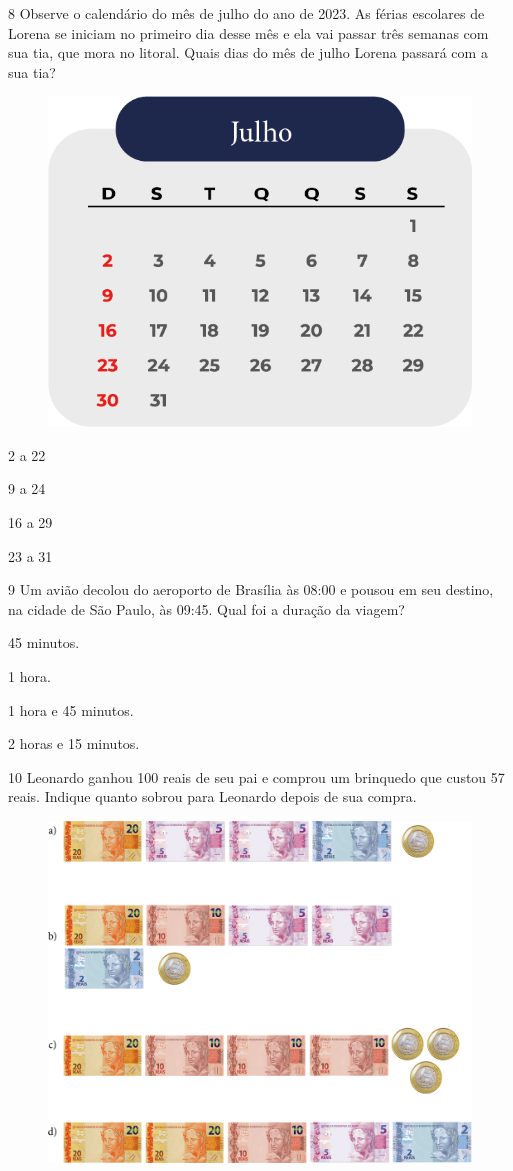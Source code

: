 \num{8} Observe o calendário do mês de julho do ano de 2023. As férias escolares
de Lorena se iniciam no primeiro dia desse mês e ela vai passar três
semanas com sua tia, que mora no litoral. Quais dias do mês de julho
Lorena passará com a sua tia?

\begin{figure}[htpb!]
\centering
\includegraphics[width=.5\textwidth]{./media/image130.png}
\end{figure}

\begin{escolha}
\item 2 a 22

\item 9 a 24

\item 16 a 29

\item 23 a 31
\end{escolha}

\num{9} Um avião decolou do aeroporto de Brasília às 08:00 e pousou em seu
destino, na cidade de São Paulo, às 09:45. Qual foi a duração da viagem?

\begin{escolha}
\item 45 minutos.

\item 1 hora.

\item 1 hora e 45 minutos.

\item 2 horas e 15 minutos.
\end{escolha}

\num{10} Leonardo ganhou 100 reais de seu pai e comprou um brinquedo que custou
57 reais. Indique quanto sobrou para Leonardo depois de sua compra.

\begin{figure}[htpb!]
\includegraphics[width=.7\textwidth]{./media/image131.png}
\end{figure}

